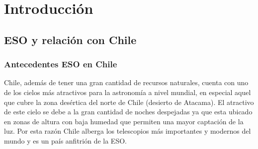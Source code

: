 \chapter{Introducción}
	\section{ESO y relación con Chile}
		\subsection{Antecedentes ESO en Chile}
			Chile, además de tener una gran cantidad de recursos naturales, cuenta con uno de los cielos más atractivos para la astronomía a nivel mundial, en especial aquel que cubre la zona desértica del norte de Chile (desierto de Atacama). El atractivo de este cielo se debe a la gran cantidad de noches despejadas ya que esta ubicado en zonas de altura con baja humedad que permiten una mayor captación de la luz. Por esta razón Chile alberga los telescopios más importantes y modernos del mundo y es un país anfitrión de la ESO.
			
